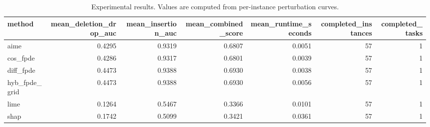 \begin{table}[t]
\caption{Experimental results. Values are computed from per-instance perturbation curves.}
\label{tab:main_results_computed}
\centering
\begin{tabular}{lrrrrrr}
\toprule
method & mean\_deletion\_drop\_auc & mean\_insertion\_auc & mean\_combined\_score & mean\_runtime\_seconds & completed\_instances & completed\_tasks \\
\midrule
aime & 0.4295 & 0.9319 & 0.6807 & 0.0051 & 57 & 1 \\
cos\_fpde & 0.4286 & 0.9317 & 0.6801 & 0.0039 & 57 & 1 \\
diff\_fpde & 0.4473 & 0.9388 & 0.6930 & 0.0038 & 57 & 1 \\
hyb\_fpde\_grid & 0.4473 & 0.9388 & 0.6930 & 0.0056 & 57 & 1 \\
lime & 0.1264 & 0.5467 & 0.3366 & 0.0101 & 57 & 1 \\
shap & 0.1742 & 0.5099 & 0.3421 & 0.0361 & 57 & 1 \\
\bottomrule
\end{tabular}

\end{table}
